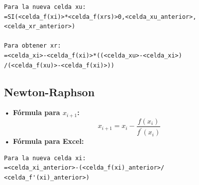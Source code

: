 \documentclass[letterpaper, 12pt]{article}
\begin{document}
\begin{justify}
{\begin{verbatim}
Para la nueva celda xu:
=SI(<celda_f(xi)>*<celda_f(xrs)>0,<celda_xu_anterior>,
<celda_xr_anterior>)

Para obtener xr:
=<celda_xi>-<celda_f(xi)>*((<celda_xu>-<celda_xi>)
/(<celda_f(xu)>-<celda_f(xi)>))
\end{verbatim}}
        \subsection*{Newton-Raphson}
        \justify
        \textbf{• Fórmula para \(x_{i+1}\):}
        {\large \[x_{i+1}=x_i-\frac{f(x_i)}{f^{\prime}(x_i)}\]}
        \justify
        \textbf{• Fórmula para Excel:}
{\large\begin{verbatim}
Para la nueva celda xi:
=<celda_xi_anterior>-(<celda_f(xi)_anterior>/
<celda_f'(xi)_anterior>)
\end{verbatim}}
        \end{justify}
\end{document}

